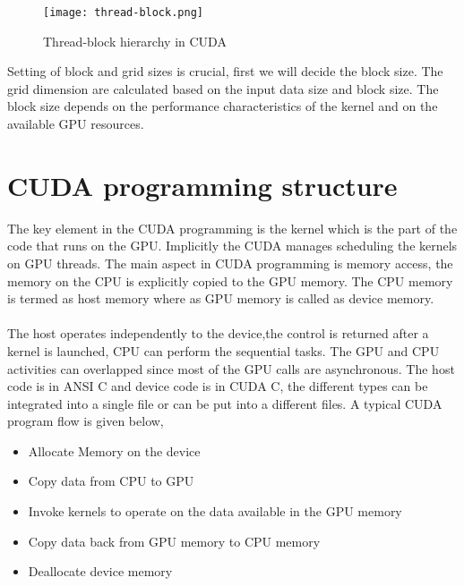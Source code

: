 \begin{figure}[h!]
  \centering
  \texttt{[image: thread-block.png]}
  \caption{Thread-block hierarchy in CUDA \cite{ProfessionalCUDA}}
  \label{Thread-block hierarchy}
\end{figure}
Setting of block and grid sizes is crucial, first we will decide the block size. The grid dimension are calculated based on the input data size and block size. The block size depends on the performance characteristics of the kernel and on the available GPU resources.
\section{CUDA programming structure}
The key element in the CUDA programming is the kernel which is the part of the code that runs on the GPU. Implicitly the CUDA manages scheduling the kernels on GPU threads. The main aspect in CUDA programming is memory access, the memory on the CPU is explicitly copied to the GPU memory. The CPU memory is termed as host memory where as GPU memory is called as device memory.\paragraph*{}The host operates independently to the device,the control is returned after a kernel is launched, CPU can perform the sequential tasks. The GPU and CPU activities can overlapped since most of the GPU calls are asynchronous. The host code is in ANSI C and device code is in CUDA C, the different types can be integrated into a single file or can be put into a different files. A typical CUDA program flow is given below,
\begin{itemize}
\item Allocate Memory on the device
\item Copy data from CPU to GPU
\item Invoke kernels to operate on the data available in the GPU memory
\item Copy data back from GPU memory to CPU memory
\item Deallocate device memory
\end{itemize}

